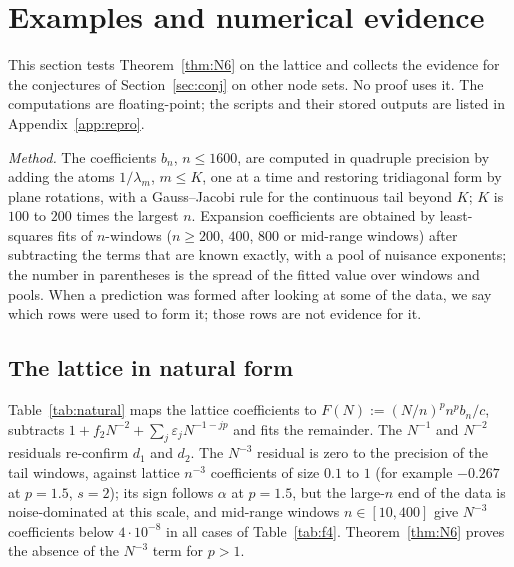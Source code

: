 \section{Examples and numerical evidence}\label{sec:examples}

This section tests Theorem~\ref{thm:N6} on the lattice and collects the evidence for the conjectures of
Section~\ref{sec:conj} on other node sets. No proof uses it. The computations are floating-point; the scripts and their
stored outputs are listed in Appendix~\ref{app:repro}.

\emph{Method.} The coefficients $b_n$, $n\le1600$, are computed in quadruple precision by adding the atoms
$1/\lambda_m$, $m\le K$, one at a time and restoring tridiagonal form by plane rotations, with a Gauss--Jacobi rule for the
continuous tail beyond $K$; $K$ is $100$ to $200$ times the largest $n$. Expansion coefficients are obtained by
least-squares fits of $n$-windows ($n\ge200$, $400$, $800$ or mid-range windows) after subtracting the terms that are known
exactly, with a pool of nuisance exponents; the number in parentheses is the spread of the fitted value over windows and
pools. When a prediction was formed after looking at some of the data, we say which rows were used to form it; those
rows are not evidence for it.

\subsection{The lattice in natural form}\label{sec:num-lattice}
Table~\ref{tab:natural} maps the lattice coefficients to $F(N):=(N/n)^pn^pb_n/c$, subtracts $1+f_2N^{-2}+\sum_j\varepsilon_jN^{-1-jp}$
and fits the remainder. The $N^{-1}$ and $N^{-2}$ residuals re-confirm $d_1$ and $d_2$. The $N^{-3}$ residual is zero
to the precision of the tail windows, against lattice $n^{-3}$ coefficients of size $0.1$ to $1$ (for example $-0.267$ at
$p=1.5$, $s=2$); its sign follows $\alpha$ at $p=1.5$, but the large-$n$ end of the data is noise-dominated at this scale,
and mid-range windows $n\in[10,400]$ give $N^{-3}$ coefficients below $4\cdot10^{-8}$ in all cases of
Table~\ref{tab:f4}. Theorem~\ref{thm:N6} proves the absence of the $N^{-3}$ term for $p>1$.

